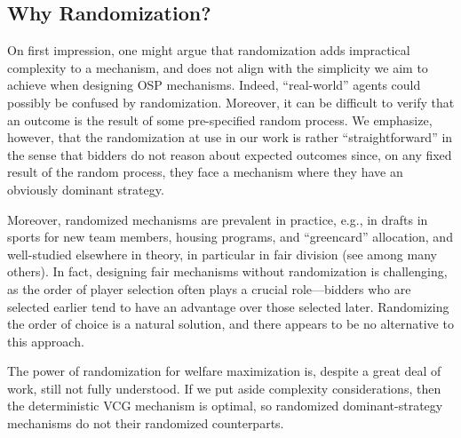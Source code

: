 \subsection{Why Randomization?}
On first impression, one might argue that randomization adds impractical complexity to a mechanism, and does not align with the simplicity we aim to achieve when designing OSP mechanisms.  Indeed,  ``real-world'' agents could possibly be confused by randomization. 
Moreover, it can be difficult to verify that an outcome is the result of some pre-specified random process.  We emphasize, however, that the randomization at use in our work is rather ``straightforward'' in the sense that bidders do not reason about 
expected outcomes since, on any fixed result of the random process, they face a mechanism where they have an obviously dominant strategy.

Moreover, randomized mechanisms are prevalent in practice, e.g., in drafts in sports for new team members, housing programs, and ``greencard'' allocation, and well-studied elsewhere in theory, in particular in fair division (see \cite{budish2013designing} among many others). 
In fact, designing fair mechanisms without randomization is challenging, as the order of player selection often plays a crucial role—bidders who are selected earlier tend to have an advantage over those selected later. Randomizing the order of choice is a natural solution, and there appears to be no alternative to this approach.


The power of randomization for welfare maximization is,  despite a great deal of work, still not fully understood. If we put aside complexity considerations, then the deterministic VCG mechanism is optimal, so randomized dominant-strategy mechanisms do not  their randomized counterparts.  

